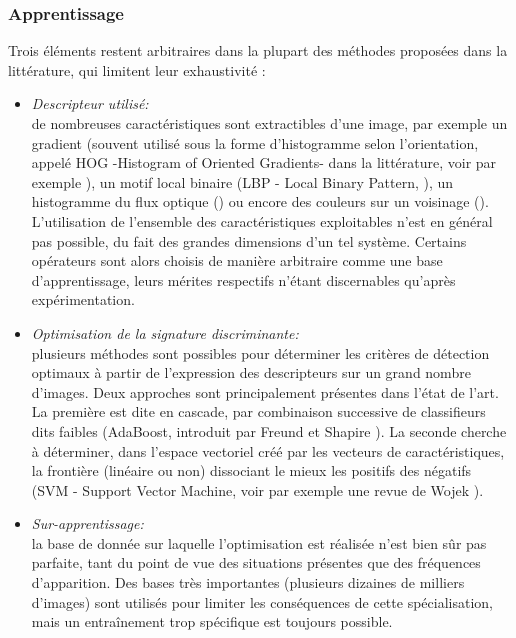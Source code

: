 \subsubsection{Apprentissage}
Trois éléments restent arbitraires dans la plupart des méthodes proposées dans la littérature, qui limitent leur exhaustivité : \\
\begin{itemize}
	\item {\textit{Descripteur utilisé:}\\} 
	de nombreuses caractéristiques sont extractibles d'une image, par exemple un gradient (souvent utilisé sous la forme d'histogramme selon l'orientation, appelé HOG -Histogram of Oriented Gradients- dans la littérature, voir par exemple \cite{Dalal2005}), un motif local binaire (LBP - Local Binary Pattern, \cite{Wang2009}), un histogramme du flux optique (\cite{Dalal2006b}) ou encore des couleurs sur un voisinage (\cite{Walk2010}). L'utilisation de l'ensemble des caractéristiques exploitables n'est en général pas possible, du fait des grandes dimensions d'un tel système. Certains opérateurs sont alors choisis de manière arbitraire comme une base d'apprentissage, leurs mérites respectifs n'étant discernables qu'après expérimentation.\\

	\item {\textit{Optimisation de la signature discriminante:}\\}
	plusieurs méthodes sont possibles pour déterminer les critères de détection optimaux à partir de l'expression des descripteurs sur un grand nombre d'images. Deux approches sont principalement présentes dans l'état de l'art. La première est dite \og en cascade\fg{}, par combinaison successive de classifieurs dits \og faibles \fg{} (AdaBoost, introduit par Freund et Shapire \cite{Freund1997}). La seconde cherche à déterminer, dans l'espace vectoriel créé par les vecteurs de caractéristiques, la frontière (linéaire ou non) dissociant le mieux les positifs des négatifs (SVM - Support Vector Machine, voir par exemple une revue de Wojek \cite{Wojek2009}).\\

	\item {\textit{\og Sur-apprentissage\fg{}:}\\}
	la base de donnée sur laquelle l'optimisation est réalisée n'est bien sûr pas parfaite, tant du point de vue des situations présentes que des fréquences d'apparition. Des bases très importantes (plusieurs dizaines de milliers d'images) sont utilisés pour limiter les conséquences de cette spécialisation, mais un entraînement trop spécifique est toujours possible.\\
\end{itemize}

